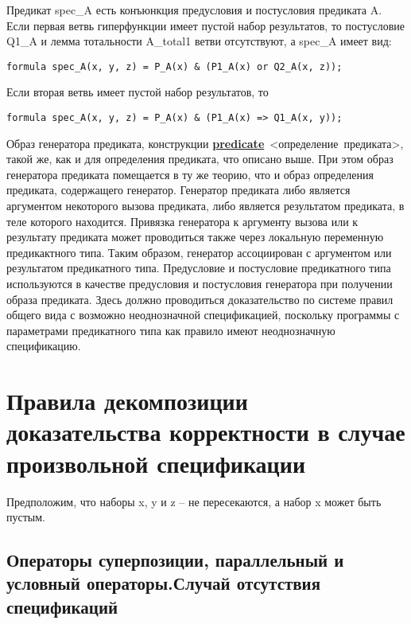 \documentclass[10pt,a4paper]{article}
\begin{document}
Предикат spec\_A есть конъюнкция предусловия и постусловия предиката A. Если первая ветвь гиперфункции имеет пустой набор результатов, то постусловие Q1\_A и лемма тотальности A\_total1 ветви отсутствуют, а spec\_A имеет вид:

\begin{center}
\begin{lstlisting}
formula spec_A(x, y, z) = P_A(x) & (P1_A(x) or Q2_A(x, z));
\end{lstlisting}
\end{center}

Если вторая ветвь имеет пустой набор результатов, то

\begin{center}
\begin{lstlisting}
formula spec_A(x, y, z) = P_A(x) & (P1_A(x) => Q1_A(x, y));
\end{lstlisting}
\end{center}

Образ генератора предиката, конструкции \underline{\textbf{predicate}} <определение предиката>, такой же, как и для определения предиката, что описано выше. При этом образ генератора предиката помещается в ту же теорию, что и образ определения предиката, содержащего генератор. Генератор предиката либо является аргументом некоторого вызова предиката, либо является результатом предиката, в теле которого находится. Привязка генератора к аргументу вызова или к результату предиката может проводиться также через локальную переменную предикактного типа. Таким образом, генератор ассоциирован с аргументом или результатом предикатного типа. Предусловие и постусловие предикатного типа используются в качестве предусловия и постусловия генератора при получении образа предиката. Здесь должно проводиться доказательство по системе правил общего вида с возможно неоднозначной спецификацией, поскольку программы с параметрами предикатного типа как правило имеют неоднозначную спецификацию.

\section{Правила декомпозиции доказательства корректности в случае произвольной спецификации}

Предположим, что наборы x, y и z – не пересекаются, а набор x может быть пустым.

\subsection{Операторы суперпозиции, параллельный и условный операторы.Случай отсутствия спецификаций}
\label{ex:specnotex}
\end{document}
